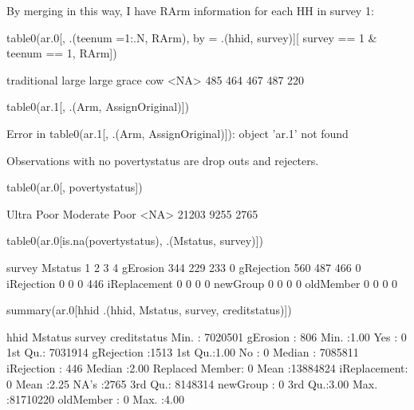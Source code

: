 By merging in this way, I have \textsf{RArm} information for each HH in survey 1:
\begin{Schunk}
\begin{Sinput}
table0(ar.0[, .(teenum =1:.N, RArm), by = .(hhid, survey)][
  survey == 1 & teenum == 1, RArm])
\end{Sinput}
\begin{Soutput}

traditional       large large grace         cow        <NA> 
        485         464         467         487         220 
\end{Soutput}
\begin{Sinput}
table0(ar.1[, .(Arm, AssignOriginal)])
\end{Sinput}
\begin{Soutput}
Error in table0(ar.1[, .(Arm, AssignOriginal)]): object 'ar.1' not found
\end{Soutput}
\end{Schunk}
Observations with no \textsf{povertystatus} are drop outs and rejecters.
\begin{Schunk}
\begin{Sinput}
table0(ar.0[, povertystatus])
\end{Sinput}
\begin{Soutput}

   Ultra Poor Moderate Poor          <NA> 
        21203          9255          2765 
\end{Soutput}
\begin{Sinput}
table0(ar.0[is.na(povertystatus), .(Mstatus, survey)])
\end{Sinput}
\begin{Soutput}
              survey
Mstatus          1   2   3   4
  gErosion     344 229 233   0
  gRejection   560 487 466   0
  iRejection     0   0   0 446
  iReplacement   0   0   0   0
  newGroup       0   0   0   0
  oldMember      0   0   0   0
\end{Soutput}
\begin{Sinput}
summary(ar.0[hhid %in% hhid[is.na(povertystatus)], 
  .(hhid, Mstatus, survey, creditstatus)])
\end{Sinput}
\begin{Soutput}
      hhid                  Mstatus         survey              creditstatus 
 Min.   : 7020501   gErosion    : 806   Min.   :1.00   Yes            :   0  
 1st Qu.: 7031914   gRejection  :1513   1st Qu.:1.00   No             :   0  
 Median : 7085811   iRejection  : 446   Median :2.00   Replaced Member:   0  
 Mean   :13884824   iReplacement:   0   Mean   :2.25   NA's           :2765  
 3rd Qu.: 8148314   newGroup    :   0   3rd Qu.:3.00                         
 Max.   :81710220   oldMember   :   0   Max.   :4.00                         
\end{Soutput}
\end{Schunk}


